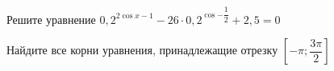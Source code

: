 \begin{ex}
	\begin{condition}
		\begin{enumcols}[label=\asbuk*)]
			\item Решите уравнение \( 0,2^{2\cos x  - 1} - 26\cdot0,2^{\cos {-\dfrac{1}{2}}} + 2,5 = 0 \)
			\item Найдите все корни уравнения, принадлежащие отрезку \( \left[-\pi;\dfrac{3\pi}{2}\right] \)
		\end{enumcols}
	\end{condition}
\end{ex}